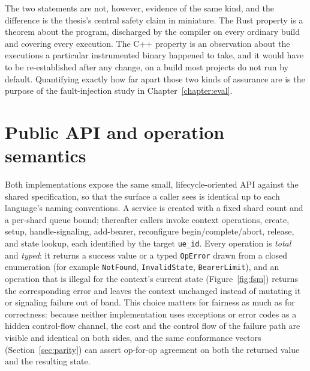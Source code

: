 \documentclass[english,twoside,openright,a4paper,censored,csm,software-track-2020]{HYthesisML}
\begin{document}
The two statements are not, however, evidence of the same kind, and the difference is the
thesis's central safety claim in miniature. The Rust property is a theorem about the program,
discharged by the compiler on every ordinary build and covering every execution. The C++
property is an observation about the executions a particular instrumented binary happened to
take, and it would have to be re-established after any change, on a build most projects do not
run by default. Quantifying exactly how far apart those two kinds of assurance are is the
purpose of the fault-injection study in Chapter~\ref{chapter:eval}.

\section{Public API and operation semantics}
Both implementations expose the same small, lifecycle-oriented API against the shared
specification, so that the surface a caller sees is identical up to each language's naming
conventions. A service is created with a fixed shard count and a per-shard queue bound;
thereafter callers invoke context operations, create, setup, handle-signaling, add-bearer,
reconfigure begin/complete/abort, release, and state lookup, each identified by the target
\texttt{ue\_id}. Every operation is \emph{total} and \emph{typed}: it returns a success value or
a typed \texttt{OpError} drawn from a closed enumeration (for example \texttt{NotFound},
\texttt{InvalidState}, \texttt{BearerLimit}), and an operation that is illegal for the context's
current state (Figure~\ref{fig:fsm}) returns the corresponding error and leaves the context
unchanged instead of mutating it or signaling failure out of band. This choice matters for
fairness as much as for correctness: because neither implementation uses exceptions or error
codes as a hidden control-flow channel, the cost and the control flow of the failure path are
visible and identical on both sides, and the same conformance vectors (Section~\ref{sec:parity})
can assert op-for-op agreement on both the returned value and the resulting state.
\end{document}
